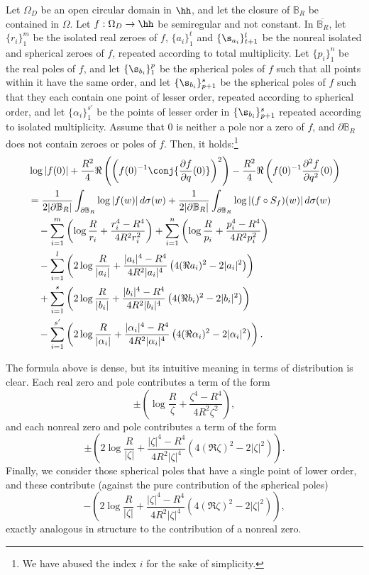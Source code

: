 \documentclass{amsart}
\begin{document}
\begin{teo}\label{PJensen}
    Let $\Omega_D$ be an open circular domain in $\hh$, and let the closure of $\mathbb{B}_R$ be contained in $\Omega$. Let $f:\Omega_D\to\hh$ be semiregular and not constant. In $\overline{\mathbb B_R}$, let $\{r_i\}_1^m$  be the isolated real zeroes of $f$, $\{a_i\}_1^t$ and $\{\s_{a_i}\}_{t+1}^l$ be the nonreal isolated and spherical zeroes of $f$,  repeated according to total multiplicity. Let $\{p_i\}_1^n$ be the real poles of $f$, and let $\{\s_{b_i}\}_1^p$ be the spherical poles of $f$ such that all points within it have the same order,  and let $\{\s_{b_i}\}_{p+1}^s$ be the spherical poles of $f$ such that they each contain one point of lesser order, repeated according to spherical order, and let $\{\alpha_i\}_{1}^{s'}$ be the points of lesser order in $\{\s_{b_i}\}_{p+1}^s$ repeated according to isolated multiplicity. Assume that $0$ is neither a pole nor a zero of $f$, and $\partial \mathbb B_R$ does not contain zeroes or poles of $f$. Then, it holds:\footnote{We have abused the index $i$ for the sake of simplicity.} 
    \begin{align*}&\log|f(0)|+\frac{R^2}4\Re \left(\left(f(0)^{-1}\conj{\frac{\partial f}{\partial q}(0)}\right)^2\right)-\frac {R^2}4\Re\left(f(0)^{-1}\frac{\partial^2f}{\partial q^2}(0)\right)\\ &=\frac1{2|\partial \mathbb B_R|}\int_{\partial \mathbb B_R}\log|f(w)|\,d\sigma(w)+\frac1{2|\partial \mathbb B_R|}\int_{\partial \mathbb B_R}\log|(f\circ S_f)(w)|\,d\sigma(w) \\ &\quad -\sum_{i=1}^m\left(\log\frac R{r_i}+\frac{r_i^4-R^4}{4R^2r_i^2}\right) + \sum_{i=1}^n\left(\log\frac R{p_i}+\frac{p_i^4-R^4}{4R^2p_i^2}\right)\\ &\quad-\sum_{i=1}^l\left(2\log\frac R{|a_i|}+\frac{|a_i|^4-R^4}{4R^2|a_i|^4}\left(4(\Re a_i)^2-2|a_i|^2\right)\right)\\&\quad+\sum_{i=1}^s\left(2\log\frac R{|b_i|}+\frac{|b_i|^4-R^4}{4R^2|b_i|^4}\left(4(\Re b_i)^2-2|b_i|^2\right)\right)\\&\quad -\sum_{i=1}^{s'}\left(2\log\frac R{|\alpha_i|}+\frac{|\alpha_i|^4-R^4}{4R^2|\alpha_i|^4}\left(4(\Re \alpha_i)^2-2|\alpha_i|^2\right)\right)
    .\end{align*}
\end{teo}
The formula above is dense, but its intuitive meaning in terms of distribution is clear. Each real zero and pole contributes a term of the form \[\pm\left(\log\frac{R}{\zeta}+\frac{\zeta^4-R^4}{4R^2\zeta^2}\right),\] and each nonreal zero and pole contributes a term of the form \[ \pm\left(2\log\frac{R}{|\zeta|}+\frac{|\zeta|^4-R^4}{4R^2|\zeta|^4}\left(4(\Re \zeta)^2-2|\zeta|^2\right)\right).\]Finally, we consider those spherical poles that have a single point of lower order, and these contribute (against the pure contribution of the spherical poles) \[-\left(2\log\frac{R}{|\zeta|}+\frac{|\zeta|^4-R^4}{4R^2|\zeta|^4}\left(4(\Re \zeta)^2-2|\zeta|^2\right)\right),\] exactly analogous in structure to the contribution of a nonreal zero.  
\end{document}
